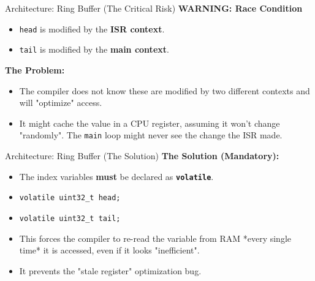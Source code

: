 \documentclass{beamer}
\begin{document}
		\begin{frame}{Architecture: Ring Buffer (The Critical Risk)}
		\textbf{WARNING: Race Condition}
		\begin{itemize}
		\item \texttt{head} is modified by the \textbf{ISR context}.
	\item \texttt{tail} is modified by the \textbf{main context}.
\end{itemize}

\medskip
\textbf{The Problem:}
\begin{itemize}
\item The compiler does not know these are modified by two different contexts and will "optimize" access.
\item It might cache the value in a CPU register, assuming it won't change "randomly". The \texttt{main} loop might never see the change the ISR made.
\end{itemize}
\end{frame}

\begin{frame}[fragile]{Architecture: Ring Buffer (The Solution)}
\textbf{The Solution (Mandatory):}
\begin{itemize}
\item The index variables \textbf{must} be declared as \textbf{\texttt{volatile}}.
\item \texttt{volatile uint32\_t head;}
\item \texttt{volatile uint32\_t tail;}
\item This forces the compiler to re-read the variable from RAM *every single time* it is accessed, even if it looks "inefficient".
\item It prevents the "stale register" optimization bug.
\end{itemize}
\end{frame}
\end{document}
